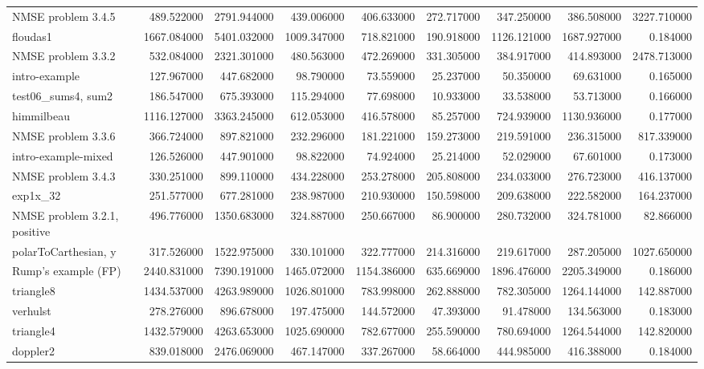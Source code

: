 \begin{longtable}{lrrrrrrrr}
NMSE problem 3.4.5 & 489.522000 & 2791.944000 & 439.006000 & 406.633000 & 272.717000 & 347.250000 & 386.508000 & 3227.710000 \\
floudas1 & 1667.084000 & 5401.032000 & 1009.347000 & 718.821000 & 190.918000 & 1126.121000 & 1687.927000 & 0.184000 \\
NMSE problem 3.3.2 & 532.084000 & 2321.301000 & 480.563000 & 472.269000 & 331.305000 & 384.917000 & 414.893000 & 2478.713000 \\
intro-example & 127.967000 & 447.682000 & 98.790000 & 73.559000 & 25.237000 & 50.350000 & 69.631000 & 0.165000 \\
test06\_sums4, sum2 & 186.547000 & 675.393000 & 115.294000 & 77.698000 & 10.933000 & 33.538000 & 53.713000 & 0.166000 \\
himmilbeau & 1116.127000 & 3363.245000 & 612.053000 & 416.578000 & 85.257000 & 724.939000 & 1130.936000 & 0.177000 \\
NMSE problem 3.3.6 & 366.724000 & 897.821000 & 232.296000 & 181.221000 & 159.273000 & 219.591000 & 236.315000 & 817.339000 \\
intro-example-mixed & 126.526000 & 447.901000 & 98.822000 & 74.924000 & 25.214000 & 52.029000 & 67.601000 & 0.173000 \\
NMSE problem 3.4.3 & 330.251000 & 899.110000 & 434.228000 & 253.278000 & 205.808000 & 234.033000 & 276.723000 & 416.137000 \\
exp1x\_32 & 251.577000 & 677.281000 & 238.987000 & 210.930000 & 150.598000 & 209.638000 & 222.582000 & 164.237000 \\
NMSE problem 3.2.1, positive & 496.776000 & 1350.683000 & 324.887000 & 250.667000 & 86.900000 & 280.732000 & 324.781000 & 82.866000 \\
polarToCarthesian, y & 317.526000 & 1522.975000 & 330.101000 & 322.777000 & 214.316000 & 219.617000 & 287.205000 & 1027.650000 \\
Rump's example (FP) & 2440.831000 & 7390.191000 & 1465.072000 & 1154.386000 & 635.669000 & 1896.476000 & 2205.349000 & 0.186000 \\
triangle8 & 1434.537000 & 4263.989000 & 1026.801000 & 783.998000 & 262.888000 & 782.305000 & 1264.144000 & 142.887000 \\
verhulst & 278.276000 & 896.678000 & 197.475000 & 144.572000 & 47.393000 & 91.478000 & 134.563000 & 0.183000 \\
triangle4 & 1432.579000 & 4263.653000 & 1025.690000 & 782.677000 & 255.590000 & 780.694000 & 1264.544000 & 142.820000 \\
doppler2 & 839.018000 & 2476.069000 & 467.147000 & 337.267000 & 58.664000 & 444.985000 & 416.388000 & 0.184000 \\
\hline
\end{longtable}

\endgroup
\clearpage
\twocolumn
